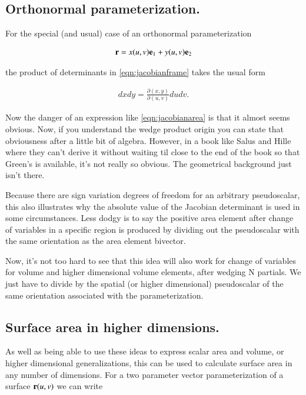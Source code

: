 \documentclass{article}
\newcommand{\PD}[2]{\frac{\partial {#2}}{\partial {#1}}}
\begin{document}
\subsection{ Orthonormal parameterization. } 

For the special (and usual) case of an orthonormal parameterization

\begin{align*}
\mathbf{r} = x(u,v) \mathbf{e}_1 + y(u,v) \mathbf{e}_2
\end{align*}

the product of determinants in \ref{eqn:jacobianframe} takes the usual form

\begin{align}\label{eqn:jacobianarea}
dx dy = \PD{(u,v)}{(x,y)} du dv.
\end{align}

Now the danger of an expression like \ref{eqn:jacobianarea} is that it almost
seems obvious.  Now, if you understand the wedge product origin you can state
that obviousness after a little bit of algebra.  However, in a book like Salus and Hille where
they can't derive it without waiting til close to the end of the book so that Green's is
available, it's not really so obvious.  The geometrical background just isn't there.

Because there are sign variation degrees of freedom for an arbitrary pseudoscalar, this also illustrates why the absolute value of the Jacobian determinant is used in some circumstances.  Less dodgy is to say the positive area element after change of variables in a specific region is produced by dividing out the pseudoscalar with the same orientation as the area element bivector.

Now, it's not too hard to see that this idea will also work for change of variables for volume and higher
dimensional volume elements, after wedging N partials.  We just have to divide by the spatial (or higher dimensional) pseudoscalar of the
same orientation associated with the parameterization.

\subsection{ Surface area in higher dimensions. }

As well as being able to use these ideas to express scalar area and volume, or higher dimensional generalizations, this can be used to calculate surface area in any number of dimensions.  For a two parameter vector parameterization of a surface $\mathbf{r}(u,v)$ we can write
\end{document}
